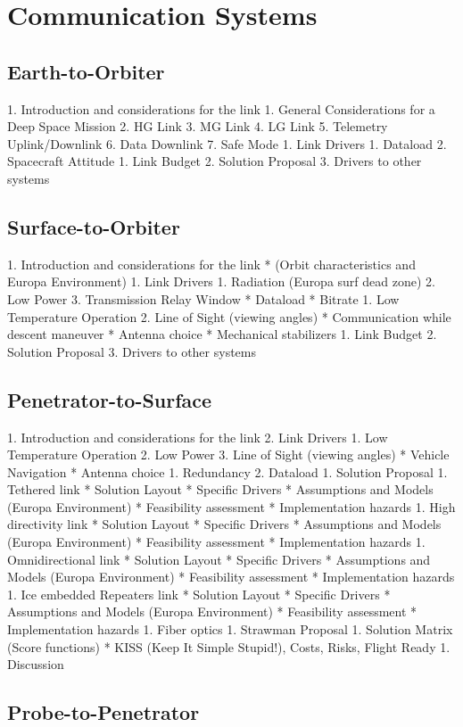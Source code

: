 \chapter{Communication Systems}

\section{Earth-to-Orbiter} %

1. Introduction and considerations for the link
   1. General Considerations for a Deep Space Mission
   2. HG Link
   3. MG Link
   4. LG Link
   5. Telemetry Uplink/Downlink
   6. Data Downlink
   7. Safe Mode
1. Link Drivers
   1. Dataload
   2. Spacecraft Attitude
1. Link Budget
2. Solution Proposal
3. Drivers to other systems

\section{Surface-to-Orbiter} %

1. Introduction and considerations for the link
      * (Orbit characteristics and Europa Environment)
1. Link Drivers
   1. Radiation (Europa surf dead zone)
   2. Low Power
   3. Transmission Relay Window
      * Dataload
      * Bitrate
   1. Low Temperature Operation
   2. Line of Sight (viewing angles)
      * Communication while descent maneuver
      * Antenna choice
      * Mechanical stabilizers
1. Link Budget
2. Solution Proposal
3. Drivers to other systems

\section{Penetrator-to-Surface} %

1. Introduction and considerations for the link
2. Link Drivers
   1. Low Temperature Operation
   2. Low Power
   3. Line of Sight (viewing angles)
      * Vehicle Navigation
      * Antenna choice
   1. Redundancy
   2. Dataload
1. Solution Proposal
   1. Tethered link
      * Solution Layout
         * Specific Drivers
      * Assumptions and Models (Europa Environment)
      * Feasibility assessment
      * Implementation hazards
   1. High directivity link
      * Solution Layout
         * Specific Drivers
      * Assumptions and Models (Europa Environment)
      * Feasibility assessment
      * Implementation hazards
   1. Omnidirectional link
      * Solution Layout
         * Specific Drivers
      * Assumptions and Models (Europa Environment)
      * Feasibility assessment
      * Implementation hazards
   1. Ice embedded Repeaters link
      * Solution Layout
         * Specific Drivers
      * Assumptions and Models (Europa Environment)
      * Feasibility assessment
      * Implementation hazards
    1. Fiber optics
1. Strawman Proposal
   1. Solution Matrix (Score functions)
      * KISS (Keep It Simple Stupid!), Costs, Risks, Flight Ready
   1. Discussion

\section{Probe-to-Penetrator}
